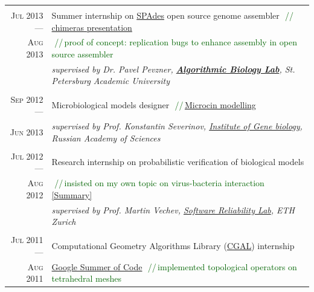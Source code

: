 \documentclass[a4paper,10pt]{article}
\def\myline{\color{linegray}\vline}
\newcommand{\minorcolor}[1]{\textcolor{mygray}{#1}}
\newcommand{\comment}[1]{\small\textcolor{darkgreen}{\,\,//\,#1}}
\newcommand{\mydate}[1]{\minorcolor{\textsc{#1}}}
\begin{document}
{{\begin{tabular}{r!{\myline}p{14cm}}
        \\
        \mydate{Jul 2013 ---}       &   Summer internship on \href{http://bioinf.spbau.ru/spades}{SPAdes} open source genome assembler
                                        \comment{\href{http://pesho.info/wp-content/uploads/chimeras-final.pdf}{chimeras presentation}}\\
        \mydate{Aug 2013}           &   \comment{proof of concept: replication bugs to enhance assembly in open source assembler}\\
                                    &   \textit{supervised by Dr. Pavel Pevzner, \href{http://bioinf.spbau.ru/}{\textbf{Algorithmic Biology Lab}}, St. Petersburg Academic University}\\

        \\
        \mydate{Sep 2012 ---}       &   Microbiological models designer
                                        \comment{\href{https://docs.google.com/document/d/1tNkXLaWY3ooA4MEnrbrL2_DOpOaiTlLoFblwzKFZdy0/edit?usp=sharing}{Microcin modelling}}\\
        \mydate{Jun 2013}           &   \textit{supervised by Prof. Konstantin Severinov, \href{http://www.genebiology.ru/}{Institute of Gene biology}, Russian Academy of Sciences}\\

        \\
        \mydate{Jul 2012 ---}       &   Research internship on probabilistic verification of biological models\\
        \mydate{Aug 2012}           &   \comment{insisted on my own topic on virus-bacteria interaction \href{https://docs.google.com/document/d/1tNkXLaWY3ooA4MEnrbrL2_DOpOaiTlLoFblwzKFZdy0/edit?usp=sharing}{[Summary]}}\\
                                    &   \textit{supervised by Prof. Martin Vechev, \href{http://www.srl.inf.ethz.ch/}{Software Reliability Lab}, ETH Zurich}\\

        \\
        \mydate{Jul 2011 ---}       &   Computational Geometry Algorithms Library (\href{http://www.cgal.org/}{CGAL}) internship\\
        \mydate{Aug 2011}           &   \href{http://code.google.com/soc/}{Google Summer of Code}
                                        \comment{implemented topological operators on tetrahedral meshes}\\


\end{tabular}}}
\end{document}
